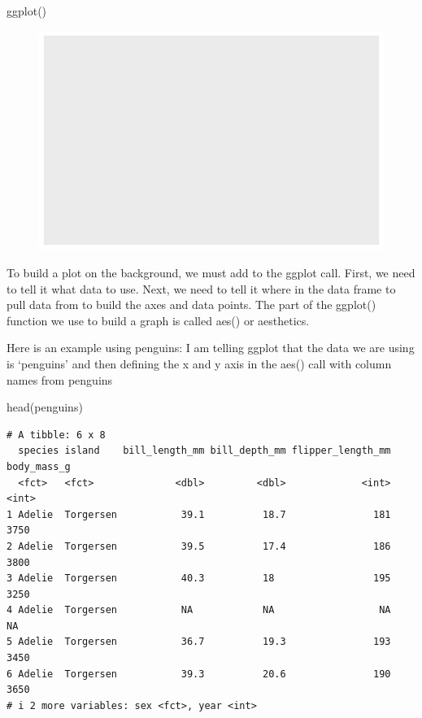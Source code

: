 \documentclass[
  letterpaper,
  DIV=11,
  numbers=noendperiod]{scrartcl}
\newenvironment{Shaded}{\begin{snugshade}}{\end{snugshade}}
\newcommand{\FunctionTok}[1]{\textcolor[rgb]{0.28,0.35,0.67}{#1}}
\newcommand{\NormalTok}[1]{\textcolor[rgb]{0.00,0.23,0.31}{#1}}
\begin{document}
\begin{Shaded}
\begin{Highlighting}[]
\FunctionTok{ggplot}\NormalTok{()}
\end{Highlighting}
\end{Shaded}

\begin{figure}[H]

{\centering \includegraphics{Lab_2_files/figure-pdf/unnamed-chunk-2-1.pdf}

}

\end{figure}

To build a plot on the background, we must add to the ggplot call.
First, we need to tell it what data to use. Next, we need to tell it
where in the data frame to pull data from to build the axes and data
points. The part of the ggplot() function we use to build a graph is
called aes() or aesthetics.

Here is an example using penguins: I am telling ggplot that the data we
are using is `penguins' and then defining the x and y axis in the aes()
call with column names from penguins

\begin{Shaded}
\begin{Highlighting}[]
\FunctionTok{head}\NormalTok{(penguins)}
\end{Highlighting}
\end{Shaded}

\begin{verbatim}
# A tibble: 6 x 8
  species island    bill_length_mm bill_depth_mm flipper_length_mm body_mass_g
  <fct>   <fct>              <dbl>         <dbl>             <int>       <int>
1 Adelie  Torgersen           39.1          18.7               181        3750
2 Adelie  Torgersen           39.5          17.4               186        3800
3 Adelie  Torgersen           40.3          18                 195        3250
4 Adelie  Torgersen           NA            NA                  NA          NA
5 Adelie  Torgersen           36.7          19.3               193        3450
6 Adelie  Torgersen           39.3          20.6               190        3650
# i 2 more variables: sex <fct>, year <int>
\end{verbatim}
\end{document}
